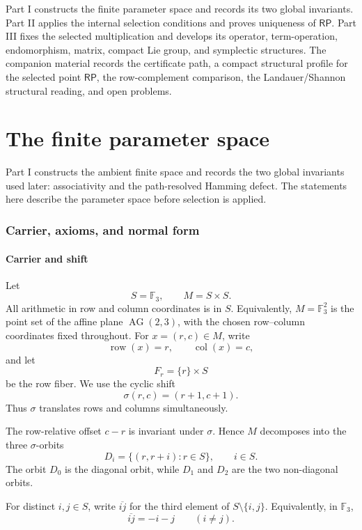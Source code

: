 \documentclass[11pt]{article}
\theoremstyle{definition}
\newcommand{\RP}{\mathsf{RP}}
\begin{document}
Part I constructs the finite parameter space and records its two global invariants.  Part
II applies the internal selection conditions and proves uniqueness of \(\RP\).  Part III
fixes the selected multiplication and develops its operator, term-operation,
endomorphism, matrix, compact Lie group, and symplectic structures.  The
companion material records the certificate path, a compact structural profile for the
selected point \(\RP\), the row-complement comparison, the Landauer/Shannon
structural reading, and open problems.

\part{The finite parameter space}

Part I constructs the ambient finite space and records the two global invariants used later: associativity and the path-resolved Hamming defect.  The statements here describe the parameter space before selection is applied.

\section{Carrier, axioms, and normal form}\label{carrier-axioms-normal-form}\label{carrier-axioms-and-normal-form}

\subsection{Carrier and shift}\label{carrier-and-shift}

Let
\[
S=\mathbb F_3,
\qquad
M=S\times S.
\]
All arithmetic in row and column coordinates is in \(S\).  Equivalently,
\(M=\mathbb F_3^2\) is the point set of the affine plane
\(\operatorname{AG}(2,3)\), with the chosen row--column coordinates fixed
throughout.  For \(x=(r,c)\in M\), write
\[
\operatorname{row}(x)=r,
\qquad
\operatorname{col}(x)=c,
\]
and let
\[
F_r=\{r\}\times S
\]
be the row fiber.  We use the cyclic shift
\[
\sigma(r,c)=(r+1,c+1).
\]
Thus \(\sigma\) translates rows and columns simultaneously.

The row-relative offset \(c-r\) is invariant under \(\sigma\).  Hence \(M\)
decomposes into the three \(\sigma\)-orbits
\[
D_i=\{(r,r+i):r\in S\},
\qquad i\in S.
\]
The orbit \(D_0\) is the diagonal orbit, while \(D_1\) and \(D_2\) are the two
non-diagonal orbits.

For distinct \(i,j\in S\), write \(\overline{ij}\) for the third element
of \(S\setminus\{i,j\}\).  Equivalently, in \(\mathbb F_3\),
\[
\overline{ij}=-i-j
\qquad (i\ne j).
\]
\end{document}
